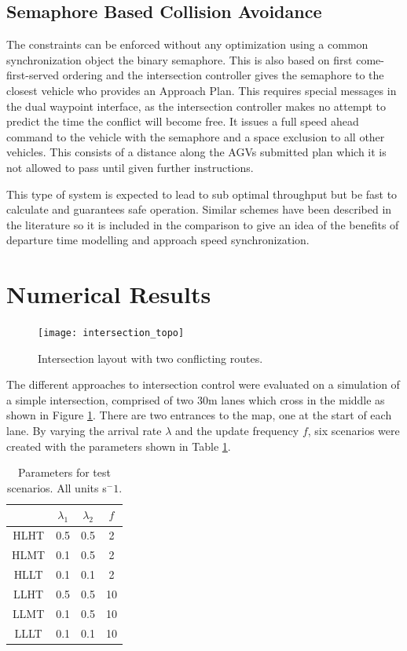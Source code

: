   
\subsection{Semaphore Based Collision Avoidance}
The constraints can be enforced without any optimization using a common synchronization object the binary semaphore. This is also based on first come-first-served ordering and the intersection controller gives the semaphore to the closest vehicle who provides an Approach Plan. This requires special messages in the dual waypoint interface, as the intersection controller makes no attempt to predict the time the conflict will become free. It issues a full speed ahead command to the vehicle with the semaphore and a space exclusion to all other vehicles. This consists of a distance along the AGVs submitted plan which it is not allowed to pass until given further instructions. 

This type of system is expected to lead to sub optimal throughput but be fast to calculate and guarantees safe operation. Similar schemes have been described in the literature so it is included in the comparison to give an idea of the benefits of departure time modelling and approach speed synchronization. 

\section{Numerical Results}

\begin{figure}[ht]
\centering
\texttt{[image: intersection\_topo]}
\caption{Intersection layout with two conflicting routes.}
\label{fig:intersection_topo}
\end{figure}

The different approaches to intersection control were evaluated on a simulation of a simple intersection, comprised of two 30m lanes which cross in the middle as shown in Figure \ref{fig:intersection_topo}. There are two entrances to the map, one at the start of each lane. By varying the arrival rate $\lambda$ and the update frequency $f$, six scenarios were created with the parameters shown in Table \ref{tab:params}.
\begin{table}
\begin{tabular}{|c|c|c|c|}
\hline
	& $\lambda_1$ & $\lambda_2$ & $f$ \\
\hline
HLHT & 0.5 & 0.5 & 2 \\
HLMT & 0.1 & 0.5 & 2 \\
HLLT & 0.1 & 0.1 & 2 \\
LLHT & 0.5 & 0.5 & 10 \\
LLMT & 0.1 & 0.5 & 10 \\
LLLT & 0.1 & 0.1 & 10 \\
\hline
\end{tabular}
\label{tab:params}
\caption{Parameters for test scenarios. All units s$^-1$. }
\end{table}

